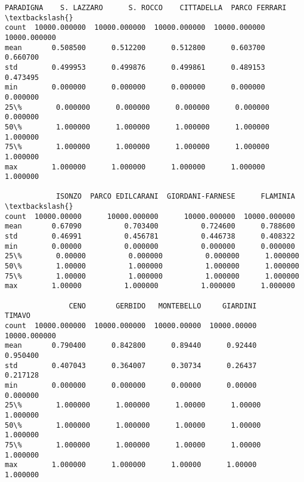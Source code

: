 \documentclass[11pt]{article}
\begin{document}
\begin{tcolorbox}[breakable, size=fbox, boxrule=.5pt, pad at break*=1mm, opacityfill=0]
\begin{Verbatim}[commandchars=\\\{\}]
          PARADIGNA    S. LAZZARO      S. ROCCO    CITTADELLA  PARCO FERRARI  \textbackslash{}
count  10000.000000  10000.000000  10000.000000  10000.000000   10000.000000
mean       0.508500      0.512200      0.512800      0.603700       0.660700
std        0.499953      0.499876      0.499861      0.489153       0.473495
min        0.000000      0.000000      0.000000      0.000000       0.000000
25\%        0.000000      0.000000      0.000000      0.000000       0.000000
50\%        1.000000      1.000000      1.000000      1.000000       1.000000
75\%        1.000000      1.000000      1.000000      1.000000       1.000000
max        1.000000      1.000000      1.000000      1.000000       1.000000

            ISONZO  PARCO EDILCARANI  GIORDANI-FARNESE      FLAMINIA  \textbackslash{}
count  10000.00000      10000.000000      10000.000000  10000.000000
mean       0.67090          0.703400          0.724600      0.788600
std        0.46991          0.456781          0.446738      0.408322
min        0.00000          0.000000          0.000000      0.000000
25\%        0.00000          0.000000          0.000000      1.000000
50\%        1.00000          1.000000          1.000000      1.000000
75\%        1.00000          1.000000          1.000000      1.000000
max        1.00000          1.000000          1.000000      1.000000

               CENO       GERBIDO   MONTEBELLO     GIARDINI        TIMAVO
count  10000.000000  10000.000000  10000.00000  10000.00000  10000.000000
mean       0.790400      0.842800      0.89440      0.92440      0.950400
std        0.407043      0.364007      0.30734      0.26437      0.217128
min        0.000000      0.000000      0.00000      0.00000      0.000000
25\%        1.000000      1.000000      1.00000      1.00000      1.000000
50\%        1.000000      1.000000      1.00000      1.00000      1.000000
75\%        1.000000      1.000000      1.00000      1.00000      1.000000
max        1.000000      1.000000      1.00000      1.00000      1.000000
\end{Verbatim}
\end{tcolorbox}
        
\end{document}
